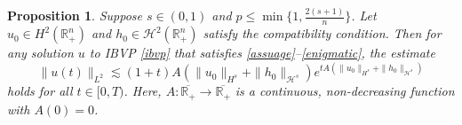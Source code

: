 \documentclass[preprint,compress,12pt]{elsarticle}
\newtheorem{proposition}[theorem]{Proposition}
\numberwithin{equation}{section}
\begin{document}
\begin{proposition}\label{pragmatic}
	Suppose $s\in(0,1)$ and $p\leq \min\{1,  \frac{2(s+1)}{n}\}$. Let $u_{0}\in H^{2}(\mathbb{R}^{n}_{+})$ and $h_{0}\in\mathcal{H}^{2}(\mathbb{R}^{n}_{+})$ satisfy the compatibility condition. Then for any solution $u$ to IBVP \eqref{ibvp} that satisfies \eqref{assuage}--\eqref{enigmatic},  the  estimate
	\begin{equation}
		\|u(t)\|_{L^{2}}\lesssim  (1+t) A\left(\|u_{0}\|_{H^{s}}+\|h_{0}\|_{\mathcal{H}^{s}}\right) e^{tA\left(\|u_{0}\|_{H^{s}}+\|h_{0}\|_{\mathcal{H}^{s}}\right)}
	\end{equation}
	holds for all $t\in[0,T)$. Here, $A:\overline{\mathbb{R}_{+}}\rightarrow \overline{\mathbb{R}_{+}}$ is a continuous, non-decreasing function with $A(0)=0$.	
\end{proposition}
\end{document}
